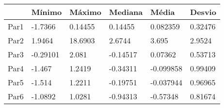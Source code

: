 \begin{tabular}{llllll}
& Mínimo & Máximo & Mediana & Média & Desvio \\ 
\hline 
Par1 & -1.7366 & 0.14455 & 0.14455 & 0.082359 & 0.32476 \\ 
Par2 & 1.9464 & 18.6903 & 2.6744 & 3.695 & 2.9524 \\ 
Par3 & -0.29101 & 2.081 & -0.14517 & 0.07362 & 0.53713 \\ 
Par4 & -1.467 & 1.2419 & -0.34311 & -0.099858 & 0.99409 \\ 
Par5 & -1.514 & 1.2211 & -0.19751 & -0.037944 & 0.96965 \\ 
Par6 & -1.0892 & 1.0281 & -0.94313 & -0.57348 & 0.81674 \\ 
\hline 
\end{tabular}